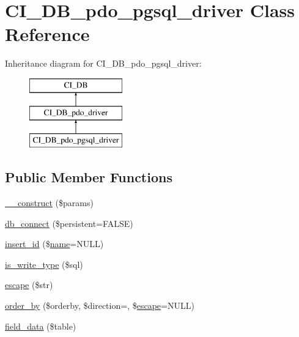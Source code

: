 \hypertarget{class_c_i___d_b__pdo__pgsql__driver}{}\section{C\+I\+\_\+\+D\+B\+\_\+pdo\+\_\+pgsql\+\_\+driver Class Reference}
\label{class_c_i___d_b__pdo__pgsql__driver}
Inheritance diagram for C\+I\+\_\+\+D\+B\+\_\+pdo\+\_\+pgsql\+\_\+driver\+:\begin{figure}[H]
\begin{center}
\leavevmode
\includegraphics[height=3.000000cm]{class_c_i___d_b__pdo__pgsql__driver}
\end{center}
\end{figure}
\subsection*{Public Member Functions}
\begin{DoxyCompactItemize}
\item 
\mbox{\hyperlink{class_c_i___d_b__pdo__pgsql__driver_a9162320adff1a1a4afd7f2372f753a3e}{\+\_\+\+\_\+construct}} (\$params)
\item 
\mbox{\hyperlink{class_c_i___d_b__pdo__pgsql__driver_a52bf595e79e96cc0a7c907a9b45aeb4d}{db\+\_\+connect}} (\$persistent=F\+A\+L\+SE)
\item 
\mbox{\hyperlink{class_c_i___d_b__pdo__pgsql__driver_ae61dc2c85e5516f143f6246c686bc3fc}{insert\+\_\+id}} (\$\mbox{\hyperlink{waiter_2order_8php_afb270cde4944e425a37cf277116a7f43}{name}}=N\+U\+LL)
\item 
\mbox{\hyperlink{class_c_i___d_b__pdo__pgsql__driver_af435df5703c238769d6d16fde6d51182}{is\+\_\+write\+\_\+type}} (\$sql)
\item 
\mbox{\hyperlink{class_c_i___d_b__pdo__pgsql__driver_ac8f37ca5703d4558c732e692194f8cd6}{escape}} (\$str)
\item 
\mbox{\hyperlink{class_c_i___d_b__pdo__pgsql__driver_a6d1ce6a3b22187165ce7d710ce91841d}{order\+\_\+by}} (\$orderby, \$direction=\textquotesingle{}\textquotesingle{}, \$\mbox{\hyperlink{class_c_i___d_b__pdo__pgsql__driver_ac8f37ca5703d4558c732e692194f8cd6}{escape}}=N\+U\+LL)
\item 
\mbox{\hyperlink{class_c_i___d_b__pdo__pgsql__driver_a90355121e1ed009e0efdbd544ab56efa}{field\+\_\+data}} (\$table)
\end{DoxyCompactItemize}
